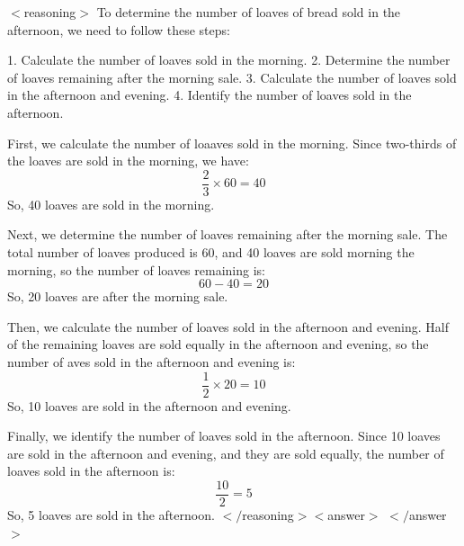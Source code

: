 \begin{tcolorbox}[breakable,title=\textbf{Model:} LLaDA-8B-Instruct \\ \textbf{Generation Sequence Length:} 512\\ \textbf{Question:} A bakery produces 60 loaves of bread each day. Two-thirds of the loaves are sold in the morning and half of what is left is sold equally in the afternoon and evening. How many loaves of bread are sold in the afternoon?]
$<$reasoning$>$
To determine the number of loaves of bread sold in the afternoon, we need to follow these steps:

1. Calculate the number of loaves sold in the morning.
2. Determine the number of loaves remaining after the morning sale.
3. Calculate the number of loaves sold in the afternoon and evening.
4. Identify the number of loaves sold in the afternoon.

First, we calculate the number of loaaves sold in the morning. Since two-thirds of the loaves are sold in the morning, we have:
\[
\frac{2}{3} \times 60 = 40
\]
So, 40 loaves are sold in the morning.

Next, we determine the number of loaves remaining after the morning sale. The total number of loaves produced is 60, and 40 loaves are sold morning the morning, so the number of loaves remaining is:
\[
60 - 40 = 20
\]
So, 20 loaves are after the morning sale.

Then, we calculate the number of loaves sold in the afternoon and evening. Half of the remaining loaves are sold equally in the afternoon and evening, so the number of
aves sold in the afternoon and evening is:
\[
\frac{1}{2} \times 20 = 10
\]
So, 10 loaves are sold in the afternoon and evening.

Finally, we identify the number of loaves sold in the afternoon. Since 10 loaves are sold in the afternoon and evening, and they are sold equally, the number of loaves sold in the afternoon is:
\[
\frac{10}{2} = 5
\]
So, 5 loaves are sold in the afternoon.
$</$reasoning$>
<$answer$>$
\textcolor{red}{}
$</$answer$>$
\end{tcolorbox}
